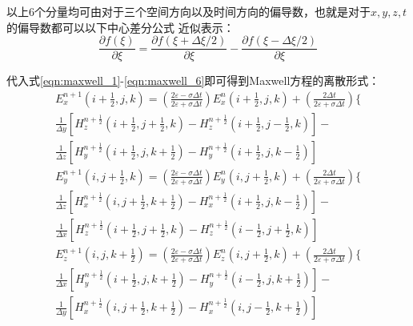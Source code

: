  以上6个分量均可由对于三个空间方向以及时间方向的偏导数，也就是对于$x, y, z, t$的偏导数都可以以下中心差分公式
 近似表示：
 \begin{equation} 
 \frac{\partial f(\xi)}{\partial \xi}=\frac{\partial f(\xi+\Delta \xi / 2)}{\partial \xi}-\frac{\partial f(\xi-\Delta \xi / 2)}{\partial \xi}
  \end{equation}

代入式\ref{eqn:maxwell_1}-\ref{eqn:maxwell_6}即可得到Maxwell方程的离散形式：
\begin{equation} 
\begin{array}{l}{E_{x}^{n+1}\left(i+\frac{1}{2}, j, k\right)=\left(\frac{2 \varepsilon-\sigma \Delta t}{2 \varepsilon+\sigma \Delta t}\right) E_{x}^{n}\left(i+\frac{1}{2}, j, k\right)+\left(\frac{2 \Delta t}{2 \varepsilon+\sigma \Delta t}\right)\{ } \\ {\frac{1}{\Delta y}\left[H_{z}^{n+\frac{1}{2}}\left(i+\frac{1}{2}, j+\frac{1}{2}, k\right)-H_{z}^{n+\frac{1}{2}}\left(i+\frac{1}{2}, j-\frac{1}{2}, k\right)\right]-} \\ {\frac{1}{\Delta z}\left[H_{y}^{n+\frac{1}{2}}\left(i+\frac{1}{2}, j, k+\frac{1}{2}\right)-H_{y}^{n+\frac{1}{2}}\left(i+\frac{1}{2}, j, k-\frac{1}{2}\right)\right]}\end{array}
 \end{equation}
 \begin{equation} 
\begin{array}{l}{E_{y}^{n+1}\left(i, j+\frac{1}{2}, k\right)=\left(\frac{2 \varepsilon-\sigma \Delta t}{2 \varepsilon+\sigma \Delta t}\right) E_{y}^{n}\left(i, j+\frac{1}{2}, k\right)+\left(\frac{2 \Delta t}{2 \varepsilon+\sigma \Delta t}\right)\{ } \\ {\frac{1}{\Delta z}\left[H_{x}^{n+\frac{1}{2}}\left(i, j+\frac{1}{2}, k+\frac{1}{2}\right)-H_{x}^{n+\frac{1}{2}}\left(i+\frac{1}{2}, j, k-\frac{1}{2}\right)\right]-} \\ {\frac{1}{\Delta x}\left[H_{z}^{n+\frac{1}{2}}\left(i+\frac{1}{2}, j+\frac{1}{2}, k\right)-H_{z}^{n+\frac{1}{2}}\left(i-\frac{1}{2}, j+\frac{1}{2}, k\right)\right]}\end{array}
 \end{equation}
 \begin{equation} 
\begin{array}{l}{E_{z}^{n+1}\left(i, j, k+\frac{1}{2}\right)=\left(\frac{2 \varepsilon-\sigma \Delta t}{2 \varepsilon+\sigma \Delta t}\right) E_{z}^{n}\left(i, j+\frac{1}{2}, k\right)+\left(\frac{2 \Delta t}{2 \varepsilon+\sigma \Delta t}\right)\{ } \\ {\frac{1}{\Delta x}\left[H_{y}^{n+\frac{1}{2}}\left(i+\frac{1}{2}, j, k+\frac{1}{2}\right)-H_{y}^{n+\frac{1}{2}}\left(i-\frac{1}{2}, j, k+\frac{1}{2}\right)\right]-} \\ {\frac{1}{\Delta y}\left[H_{x}^{n+\frac{1}{2}}\left(i, j+\frac{1}{2}, k+\frac{1}{2}\right)-H_{x}^{n+\frac{1}{2}}\left(i, j-\frac{1}{2}, k+\frac{1}{2}\right)\right]}\end{array}
 \end{equation}
